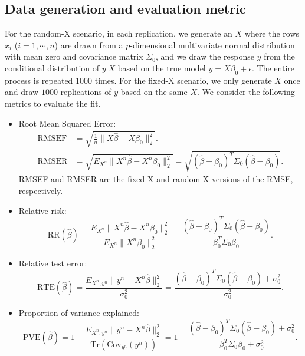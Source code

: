 \documentclass{article}
\begin{document}
\subsection{Data generation and evaluation metric}
For the random-X scenario, in each replication, we generate an $X$ where the rows $x_i$ ($i=1,\cdots,n$) are drawn from a $p$-dimensional multivariate normal distribution with mean zero and covariance matrix $\Sigma_0$, and we draw the response $y$ from the conditional distribution of $y|X$ based on the true model $y=X\beta_0+\epsilon$. The entire process is repeated $1000$ times. For the fixed-X scenario, we only generate $X$ once and draw $1000$ replications of $y$ based on the same $X$. We consider the following metrics to evaluate the fit.
\begin{itemize}
  \item Root Mean Squared Error:
  \begin{equation*}
  \begin{aligned}
    \text{RMSEF} &= \sqrt{ \frac{1}{n}\lVert X\hat{\beta} - X\beta_0 \rVert_2^2 }.\\
    \text{RMSER} &= \sqrt{E_{X^n} \lVert X^n\hat\beta-X^n\beta_0 \rVert_2^2} =  \sqrt{(\hat{\beta}-\beta_0)^T \Sigma_0 (\hat{\beta}-\beta_0)}.
  \end{aligned}
  \end{equation*}
  RMSEF and RMSER are the fixed-X and random-X versions of the RMSE, respectively. 
  \iffalse
  \item Relative risk:
  \begin{equation*}
    \text{RR}(\hat{\beta}) = \frac{E_{X^n} \lVert X^n\hat\beta-X^n\beta_0 \rVert_2^2}{E_{X^n} \lVert X^n\beta_0 \rVert_2^2} = \frac{(\hat{\beta}-\beta_0)^T \Sigma_0 (\hat{\beta}-\beta_0)}{\beta_0^T \Sigma_0 \beta_0}.
  \end{equation*}
  \item Relative test error:
  \begin{equation*}
    \text{RTE}(\hat{\beta}) = \frac{E_{X^n,y^n} \lVert y^n - X^n\hat\beta \rVert_2^2}{\sigma_0^2}= \frac{(\hat{\beta}-\beta_0)^T \Sigma_0 (\hat{\beta}-\beta_0) + \sigma_0^2}{\sigma_0^2}.
  \end{equation*}
  \item Proportion of variance explained: 
  \begin{equation*}
    \text{PVE}(\hat{\beta}) = 1 - \frac{E_{X^n,y^n} \lVert y^n- X^n\hat\beta \rVert_2^2}{\text{Tr}\left( \text{Cov}_{y^n} (y^n) \right)}= 1-\frac{(\hat{\beta}-\beta_0)^T \Sigma_0 (\hat{\beta}-\beta_0)+\sigma_0^2}{\beta_0^T \Sigma_0 \beta_0 + \sigma_0^2}.

\end{equation*}
\end{itemize}
\end{document}
